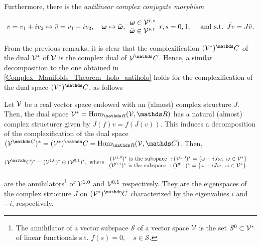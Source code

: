  Furthermore, there is the \textit{antilinear complex conjugate morphism}  

\begin{equation}
    v = v_1 + iv_2 \mapsto \bar{v} = v_1 - i v_2, \quad \bm{\omega} \mapsto \bar{\bm{\omega}}, \begin{array}{cc}
         \bm{\omega} \in \mathcal{V}^{r,s} \\
         \bar{\bm{\omega}} \in \mathcal{V}^{s,r}
    \end{array} r ,s = 0,1, \quad \textnormal{ and s.t. } \bar{Jv} = J \bar{v}.
\end{equation}

From the previous remarks, it is clear that the complexification $(\vectorspace^{*})^\C$ of the dual $\mathcal{V}^{*}$ of $\mathcal{V}$ is the complex dual of $\vectorspace^\C$. Hence, a similar decomposition to the one obtained in \cref{Complex_Manifolds_Theorem_holo_antiholo} holds for the complexification of the dual space $(\vectorspace^{*})^\C$, as follows  

 \begin{theorem}
    Let $\mathcal{V}$ be a real vector space endowed with an (almost) complex structure $J$. Then, the dual space $\vectorspace^{*} = \textnormal{Hom}_{\R}(\vectorspace, \R)$ has a natural (almost) complex structurer given by $J(f) v = f(J(v))$. This induces a decomposition of the complexification of the dual space $(\vectorspace^{\C})^{*} = (\vectorspace^{*})^\C = \textnormal{Hom}_{\R}(\vectorspace, \C)$. Then, 
 
    \begin{equation} \label{Complex_Manifolds_holo_antiholo_dual_structures}
    \begin{split}
        &(\vectorspace^\C)^{*} = (\vectorspace^{1,0})^{*} \oplus (\vectorspace^{0,1})^{*}, \textnormal{ where }\begin{array}{cc}
             \textnormal{$(\vectorspace^{1,0})^{*}$ is the subspace }: (\vectorspace^{1,0})^{*} = \{\omega - i J \omega, \blanky \omega \in \vectorspace^{*}\}  \\
            \textnormal{$(\vectorspace^{0,1})^{*}$ is the subspace }: (\vectorspace^{0,1})^{*} = \{\omega + i J \omega, \blanky \omega \in \vectorspace^{*}\}.
        \end{array}
    \end{split}
    \end{equation}

    are the annihilators\footnote{
   The annihilator of a vector subspace $\mathcal{S}$ of a vector space $\mathcal{V}$ is the set $S^{0} \subset \mathcal{V}^{*}$ of linear functionals s.t. $f(s) = 0, \quad s \in \mathcal{S}$.
    } of ${\mathcal{V}^{1,0}}$ and ${\mathcal{V}^{0,1}}$ respectively. They are the eigenspaces of the complex structure $J$ on $(\vectorspace^{*})^\C$ characterized by the eigenvalues $i$ and $-i$, respectively. 
\end{theorem} \bigbreak

